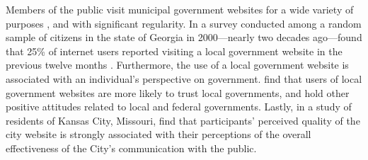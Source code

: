 \documentclass[11pt]{article}
\begin{document}
Members of the public visit municipal government websites for a wide variety of purposes \citet{sandoval2012government}, and with significant regularity. In a survey conducted among a random sample of citizens in the state of Georgia in 2000---nearly two decades ago---found that 25\% of internet users reported visiting a local government website in the previous twelve months \citep{thomas2003new}. Furthermore, the use of a local government website is associated with an individual's perspective on government. \citet{tolbert2006effects} find that users of local government websites are more likely to trust local governments, and hold other positive attitudes related to local and federal governments. Lastly, in a study of residents of Kansas City, Missouri, \citet{ho2017government} find that participants' perceived quality of the city website is strongly associated with their perceptions of the overall effectiveness of the City's communication with the public.
\end{document}
